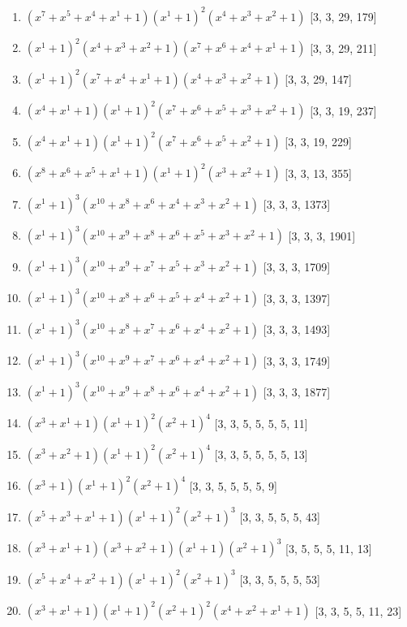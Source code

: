 \documentclass[10pt,twocolumn]{article}
\begin{document}
\begin{enumerate}
\item $(x^{7} + x^{5} + x^{4} + x^{1} + 1)(x^{1} + 1)^{2}(x^{4} + x^{3} + x^{2} + 1)$  [3, 3, 29, 179]
\item $(x^{1} + 1)^{2}(x^{4} + x^{3} + x^{2} + 1)(x^{7} + x^{6} + x^{4} + x^{1} + 1)$  [3, 3, 29, 211]
\item $(x^{1} + 1)^{2}(x^{7} + x^{4} + x^{1} + 1)(x^{4} + x^{3} + x^{2} + 1)$  [3, 3, 29, 147]
\item $(x^{4} + x^{1} + 1)(x^{1} + 1)^{2}(x^{7} + x^{6} + x^{5} + x^{3} + x^{2} + 1)$  [3, 3, 19, 237]
\item $(x^{4} + x^{1} + 1)(x^{1} + 1)^{2}(x^{7} + x^{6} + x^{5} + x^{2} + 1)$  [3, 3, 19, 229]
\item $(x^{8} + x^{6} + x^{5} + x^{1} + 1)(x^{1} + 1)^{2}(x^{3} + x^{2} + 1)$  [3, 3, 13, 355]
\item $(x^{1} + 1)^{3}(x^{10} + x^{8} + x^{6} + x^{4} + x^{3} + x^{2} + 1)$  [3, 3, 3, 1373]
\item $(x^{1} + 1)^{3}(x^{10} + x^{9} + x^{8} + x^{6} + x^{5} + x^{3} + x^{2} + 1)$  [3, 3, 3, 1901]
\item $(x^{1} + 1)^{3}(x^{10} + x^{9} + x^{7} + x^{5} + x^{3} + x^{2} + 1)$  [3, 3, 3, 1709]
\item $(x^{1} + 1)^{3}(x^{10} + x^{8} + x^{6} + x^{5} + x^{4} + x^{2} + 1)$  [3, 3, 3, 1397]
\item $(x^{1} + 1)^{3}(x^{10} + x^{8} + x^{7} + x^{6} + x^{4} + x^{2} + 1)$  [3, 3, 3, 1493]
\item $(x^{1} + 1)^{3}(x^{10} + x^{9} + x^{7} + x^{6} + x^{4} + x^{2} + 1)$  [3, 3, 3, 1749]
\item $(x^{1} + 1)^{3}(x^{10} + x^{9} + x^{8} + x^{6} + x^{4} + x^{2} + 1)$  [3, 3, 3, 1877]
\item $(x^{3} + x^{1} + 1)(x^{1} + 1)^{2}(x^{2} + 1)^{4}$  [3, 3, 5, 5, 5, 5, 11]
\item $(x^{3} + x^{2} + 1)(x^{1} + 1)^{2}(x^{2} + 1)^{4}$  [3, 3, 5, 5, 5, 5, 13]
\item $(x^{3} + 1)(x^{1} + 1)^{2}(x^{2} + 1)^{4}$  [3, 3, 5, 5, 5, 5, 9]
\item $(x^{5} + x^{3} + x^{1} + 1)(x^{1} + 1)^{2}(x^{2} + 1)^{3}$  [3, 3, 5, 5, 5, 43]
\item $(x^{3} + x^{1} + 1)(x^{3} + x^{2} + 1)(x^{1} + 1)(x^{2} + 1)^{3}$  [3, 5, 5, 5, 11, 13]
\item $(x^{5} + x^{4} + x^{2} + 1)(x^{1} + 1)^{2}(x^{2} + 1)^{3}$  [3, 3, 5, 5, 5, 53]
\item $(x^{3} + x^{1} + 1)(x^{1} + 1)^{2}(x^{2} + 1)^{2}(x^{4} + x^{2} + x^{1} + 1)$  [3, 3, 5, 5, 11, 23]

\end{enumerate}
\end{document}
